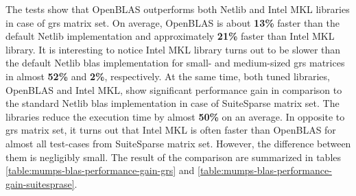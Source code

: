 The tests show that OpenBLAS outperforms both Netlib and Intel MKL libraries in case of \acrshort{grs} matrix set. On average, OpenBLAS is about \textbf{13\%} faster than the default Netlib implementation and approximately \textbf{21\%} faster than Intel MKL library. It is interesting to notice Intel MKL library turns out to be slower than the default Netlib \acrshort{blas} implementation for small- and medium-sized \acrshort{grs} matrices in almost \textbf{52\%} and \textbf{2\%}, respectively. At the same time, both tuned libraries, OpenBLAS and Intel MKL, show significant performance gain in comparison to the standard Netlib \acrshort{blas} implementation in case of SuiteSparse matrix set. The libraries reduce the execution time by almost \textbf{50\%} on an average. In opposite to \acrshort{grs} matrix set, it turns out that Intel MKL is often faster than OpenBLAS for almost all test-cases from SuiteSparse matrix set. However, the difference between them is negligibly small. The result of the comparison are summarized in tables \ref{table:mumps-blas-performance-gain-grs} and \ref{table:mumps-blas-performance-gain-suitesprase}.\\


